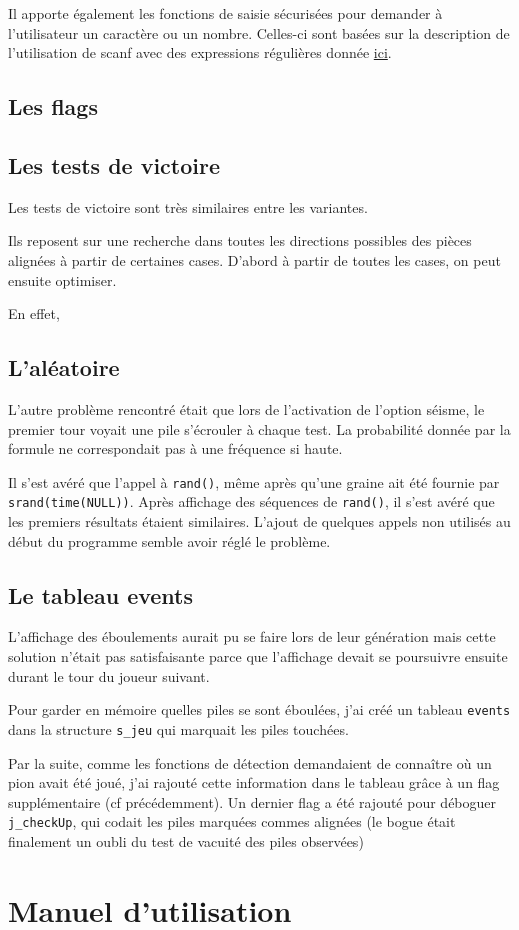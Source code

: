 \documentclass[a4paper, titlepage]{article}
\begin{document}
Il apporte également les fonctions de saisie sécurisées pour demander à l'utilisateur un caractère ou un nombre. Celles-ci sont basées sur la description de l'utilisation de scanf avec des expressions régulières donnée \href{https://openclassrooms.com/courses/la-saisie-securisee-avec-scanf}{ici}.

\subsection{Les flags}


\subsection{Les tests de victoire}
Les tests de victoire sont très similaires entre les variantes.

Ils reposent sur une recherche dans toutes les directions possibles des pièces alignées à partir de certaines cases. D'abord à partir de toutes les cases, on peut ensuite optimiser.

En effet,

\subsection{L'aléatoire}
L'autre problème rencontré était que lors de l'activation de l'option séisme, le premier tour voyait une pile s'écrouler à chaque test. La probabilité donnée par la formule ne correspondait pas à une fréquence si haute.

Il s'est avéré que l'appel à \texttt{rand()}, même après qu'une graine ait été fournie par \texttt{srand(time(NULL))}. Après affichage des séquences de \texttt{rand()}, il s'est avéré que les premiers résultats étaient similaires. L'ajout de quelques appels non utilisés au début du programme semble avoir réglé le problème.

\subsection{Le tableau events}
L'affichage des éboulements aurait pu se faire lors de leur génération mais cette solution n'était pas satisfaisante parce que l'affichage devait se poursuivre ensuite durant le tour du joueur suivant.

Pour garder en mémoire quelles piles se sont éboulées, j'ai créé un tableau \texttt{events} dans la structure \texttt{s\_jeu} qui marquait les piles touchées.

Par la suite, comme les fonctions de détection demandaient de connaître où un pion avait été joué, j'ai rajouté cette information dans le tableau  grâce à un flag supplémentaire (cf précédemment). Un dernier flag a été rajouté pour déboguer \texttt{j\_checkUp}, qui codait les piles marquées commes alignées (le bogue était finalement un oubli du test de vacuité des piles observées)

\section{Manuel d'utilisation}
\end{document}
